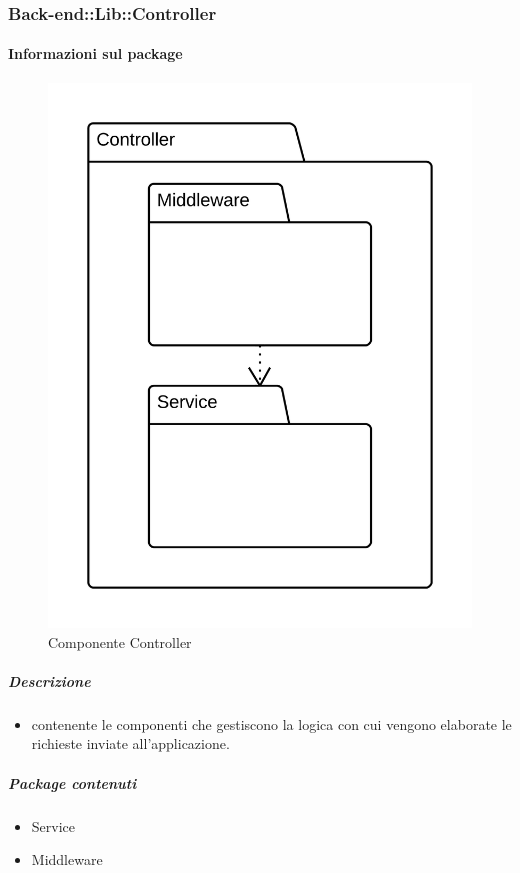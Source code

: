 	\subsubsection{Back-end::Lib::Controller}
	\paragraph{Informazioni sul package} 
		\begin{figure}[H] 
			\begin{center} 
				\includegraphics[width=\textwidth]{uml/package/Back-end::Lib::Controller.png}  
				\caption{Componente Controller}
			\end{center}  
		\end{figure} 
	\subparagraph{Descrizione} 
		\begin{itemize}
		\item[]  contenente le componenti che gestiscono la logica con cui vengono elaborate le richieste inviate all’applicazione.
		\end{itemize} 
		\subparagraph{Package contenuti} 
		\begin{itemize}
				\item Service
				\item Middleware
		\end{itemize}
